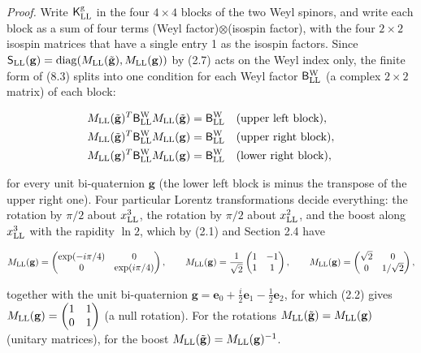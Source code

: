 \documentclass[
  10pt,
]{article}
\begin{document}
\emph{Proof.} Write \(\mathsf K^{\rm g}_{\rm LL}\) in the four
\(4\times4\) blocks of the two Weyl spinors, and write each block as a
sum of four terms (Weyl factor)\(\otimes\)(isospin factor), with the
four \(2\times2\) isospin matrices that have a single entry 1 as the
isospin factors. Since
\(\mathsf S_{\rm LL}(\mathbf g)=\mathrm{diag}(M_{\rm LL}(\tilde{\mathbf g}),M_{\rm LL}(\mathbf g))\)
by (2.7) acts on the Weyl index only, the finite form of (8.3) splits
into one condition for each Weyl factor \(\mathsf B^{\rm W}_{\rm LL}\)
(a complex \(2\times2\) matrix) of each block:

\[\begin{aligned}M_{\rm LL}(\tilde{\mathbf g})^T\mathsf B^{\rm W}_{\rm LL}M_{\rm LL}(\tilde{\mathbf g})&=\mathsf B^{\rm W}_{\rm LL}\quad\text{(upper left block)},\\M_{\rm LL}(\tilde{\mathbf g})^T\mathsf B^{\rm W}_{\rm LL}M_{\rm LL}(\mathbf g)&=\mathsf B^{\rm W}_{\rm LL}\quad\text{(upper right block)},\\M_{\rm LL}(\mathbf g)^T\mathsf B^{\rm W}_{\rm LL}M_{\rm LL}(\mathbf g)&=\mathsf B^{\rm W}_{\rm LL}\quad\text{(lower right block)},\end{aligned}\]

for every unit bi-quaternion \(\mathbf g\) (the lower left block is
minus the transpose of the upper right one). Four particular Lorentz
transformations decide everything: the rotation by \(\pi/2\) about
\(x^3_{\rm LL}\), the rotation by \(\pi/2\) about \(x^2_{\rm LL}\), and
the boost along \(x^3_{\rm LL}\) with the rapidity \(\ln2\), which by
(2.1) and Section 2.4 have

\[M_{\rm LL}(\mathbf g)=\begin{pmatrix}\exp(-i\pi/4)&0\\0&\exp(i\pi/4)\end{pmatrix},\qquad M_{\rm LL}(\mathbf g)=\frac1{\sqrt2}\begin{pmatrix}1&-1\\1&1\end{pmatrix},\qquad M_{\rm LL}(\mathbf g)=\begin{pmatrix}\sqrt2&0\\0&1/\sqrt2\end{pmatrix},\]

together with the unit bi-quaternion
\(\mathbf g=\mathbf e_0+\tfrac i2\mathbf e_1-\tfrac12\mathbf e_2\), for
which (2.2) gives
\(M_{\rm LL}(\mathbf g)=\begin{pmatrix}1&1\\0&1\end{pmatrix}\) (a null
rotation). For the rotations
\(M_{\rm LL}(\tilde{\mathbf g})=M_{\rm LL}(\mathbf g)\) (unitary
matrices), for the boost
\(M_{\rm LL}(\tilde{\mathbf g})=M_{\rm LL}(\mathbf g)^{-1}\).
\end{document}
